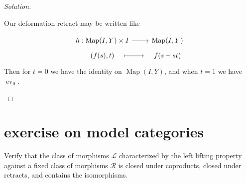 \documentclass{article}
\numberwithin{equation}{section}
\newcommand{\Lc}{\mathcal{L}}
\newcommand{\Rc}{\mathcal{R}}
\DeclareMathOperator{\Map}{Map}
\DeclareMathOperator{\ev}{ev}
\begin{document}
\begin{proof}[Solution]
\begin{enumerate}[label*=\alph*.]
		Our deformation retract may be written like
		\iffalse\[\begin{tikzcd}[row sep=tiny]
			h:\Map(I,Y) \arrow[r]&\Map(I,\Map(I,Y))\\
			f(s)\arrow[r,maps to,shorten=2em]&t\mapsto f(s-st)
		\end{tikzcd}\]\fi
		\[\begin{tikzcd}[row sep=tiny]
			h:\Map(I,Y)\times I \arrow[r]&\Map(I,Y)\\
			(f(s),t)\arrow[r,maps to,shorten=1em]&f(s-st)
		\end{tikzcd}\]
		Then for $t=0$ we have the identity on $\Map(I,Y)$, and when $t=1$ we have $\ev_0$.
	\end{enumerate}
\end{proof}
\clearpage
\section{exercise on model categories}
\begin{exercise}
	Verify that the class of morphisms $\Lc$ characterized by the left lifting property against a fixed class of morphisms $\Rc$ is closed under coproducts, closed under retracts, and contains the isomorphisms.
\end{exercise}
\end{document}
